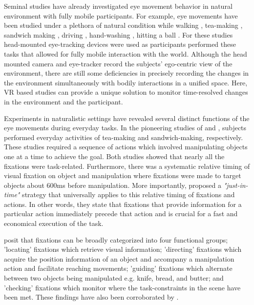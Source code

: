 Seminal studies have already investigated eye movement behavior in natural environment with fully mobile participants. For example, eye movements have been studied under a plethora of natural condition while walking \citep{Matthis2018-ho}, tea-making \citep{Land1999-ol} , sandwich making \citep{Hayhoe2003-lw} , driving \citep{Mars2012-bn, Sullivan2012-gg}, hand-washing \citep{Pelz2001-cn} , hitting a ball \citep{Land2000-pw}. For these studies head-mounted eye-tracking devices were used as participants performed these tasks that allowed for fully mobile interaction with the world. Although the head mounted camera and eye-tracker record the subjects' ego-centric view of the environment, there are still some deficiencies in precisely recording the changes in the environment simultaneously with bodily interactions in a unified space. Here, VR based studies can provide a unique solution to monitor time-resolved changes in the environment and the participant.

Experiments in naturalistic settings have revealed several distinct functions of the eye movements during everyday tasks. In the pioneering studies of \citet{Land1999-ol} and \citet{Hayhoe2003-lw}, subjects performed everyday activities of tea-making and sandwich-making, respectively. These studies required a sequence of actions which involved manipulating objects one at a time to achieve the goal. Both studies showed that nearly all the fixations were task-related. Furthermore, there was a systematic relative timing of visual fixation on object and manipulation where fixations were made to target objects about 600ms before manipulation. More importantly, \citet{Ballard1995-ji} proposed a \emph{"just-in-time"} strategy that universally applies to this relative timing of fixations and actions. In other words, they state that fixations that provide information for a particular action immediately precede that action and is crucial for a fast and economical execution of the task.

\citet{Land2001-do} posit that fixations can be broadly categorized into four functional groups; 'locating' fixations which retrieve visual information; 'directing' fixations which acquire the position information of an object and accompany a manipulation action and facilitate reaching movements; 'guiding' fixations which alternate between two objects being manipulated e.g. knife, bread, and butter; and 'checking' fixations which monitor where the task-constraints in the scene have been met. These findings have also been corroborated by \citet{Pelz2001-cn, Mennie2007-my}.

